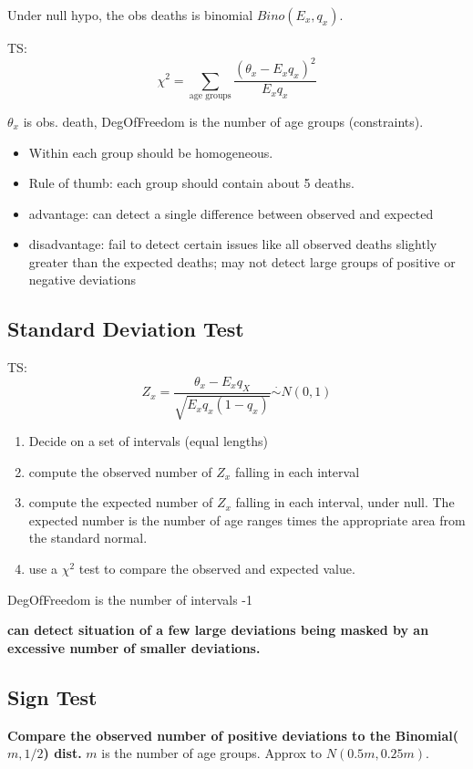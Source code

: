 \documentclass[a4paper]{article}
\begin{document}
Under null hypo, the obs deaths is binomial $Bino(E_x, q_x)$.

TS: $$\chi^2=\sum_{\text{age groups}}\frac{(\theta_x-E_xq_x)^2}{E_xq_x}$$

$\theta_x$ is obs. death, DegOfFreedom is the number of age groups (constraints).

\begin{itemize}
	\item Within each group should be homogeneous.
	\item Rule of thumb: each group should contain about 5 deaths.
	\item advantage: can detect a single difference between observed and expected
	\item disadvantage: fail to detect certain issues like all observed deaths slightly greater than the expected deaths; may not detect large groups of positive or negative deviations
\end{itemize}

\subsection{Standard Deviation Test}

TS: $$Z_x=\frac{\theta_x-E_xq_X}{\sqrt{E_xq_x(1-q_x)}}\overset{\cdot}\sim N(0,1)$$

\begin{enumerate}
	\item Decide on a set of intervals (equal lengths)
	\item compute the observed number of $Z_x$ falling in each interval
	\item compute the expected number of $Z_x$ falling in each interval, under null. The expected number is the number of age ranges times the appropriate area from the standard normal.
	\item use a $\chi^2$ test to compare the observed and expected value.
\end{enumerate}

DegOfFreedom is the number of intervals -1 

\textbf{can detect situation of a few large deviations being masked by an excessive number of smaller deviations.}

\subsection{Sign Test}

\textbf{Compare the observed number of positive deviations to the Binomial($m, 1/2$) dist.}  $m$ is the number of age groups. Approx to $N(0.5m, 0.25m)$.
\end{document}
